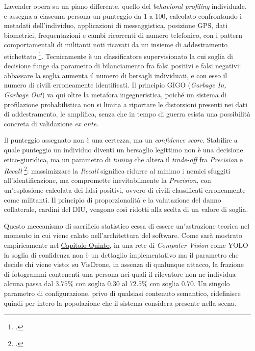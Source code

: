 \ifstampa\documentclass[a4paper,12pt,twoside,openright]{report}\else\documentclass[a4paper,12pt]{report}\fi
\newif\ifrevisione \revisionefalse
\DeclareRobustCommand{\rev}[1]{\ifrevisione{\color{blue!65!black}#1}\else#1\fi}
\begin{document}
Lavender opera su un piano differente, quello del \textit{behavioral profiling}
individuale, e assegna a ciascuna persona un punteggio da 1 a 100, calcolato
confrontando i metadati dell'individuo, applicazioni di messaggistica, posizione
GPS, dati biometrici, frequentazioni e cambi ricorrenti di numero telefonico, con
i pattern comportamentali di militanti noti ricavati da un \rev{insieme di addestramento}
etichettato \footcite{abraham_2024_lavender}. Tecnicamente è un classificatore
supervisionato la cui soglia di decisione funge da parametro di bilanciamento fra
falsi positivi e falsi negativi: abbassare la soglia aumenta il numero di
bersagli individuati, e con esso il numero di civili erroneamente identificati.
Il principio GIGO (\textit{Garbage In, Garbage Out}) va qui oltre la metafora
ingegneristica, poiché un sistema di profilazione probabilistica non si limita a
riportare le distorsioni presenti nei dati di addestramento, le amplifica, senza
che in tempo di guerra esista una possibilità concreta di validazione
\textit{ex ante}.

Il punteggio assegnato non è una certezza, ma un \textit{confidence score}. Stabilire a quale punteggio un individuo diventi un bersaglio
legittimo non è una decisione etico-giuridica, ma un parametro di \textit{tuning}
che altera il \textit{trade-off} fra \textit{Precision} e \textit{Recall}
\footcite{podar_2025}: massimizzare la \textit{Recall} significa ridurre al minimo
i nemici sfuggiti all'identificazione, ma compromette inevitabilmente la
\textit{Precision}, con un'esplosione calcolata dei falsi positivi, ovvero di
civili classificati erroneamente come militanti. Il principio di proporzionalità e
la valutazione del danno collaterale, cardini del DIU, vengono così \rev{ridotti alla scelta di un
valore di soglia.}

Questo meccanismo di sacrificio statistico cessa di essere un'astrazione teorica
nel momento in cui viene calato nell'architettura del software. Come sarà
mostrato empiricamente nel \hyperref[cap5]{Capitolo Quinto}, in una rete di \textit{Computer
Vision} come YOLO la soglia di confidenza non è un dettaglio implementativo ma il
parametro che decide chi viene visto: \rev{su VisDrone, in assenza
di qualunque attacco, la frazione di fotogrammi contenenti una persona nei quali
il rilevatore non ne individua alcuna passa dal $3.75\%$ con soglia $0.30$ al
$72.5\%$ con soglia $0.70$. Un singolo parametro di configurazione, privo} di qualsiasi contenuto semantico,
ridefinisce quindi per intero la popolazione che il sistema considera presente
nella scena.
\end{document}
